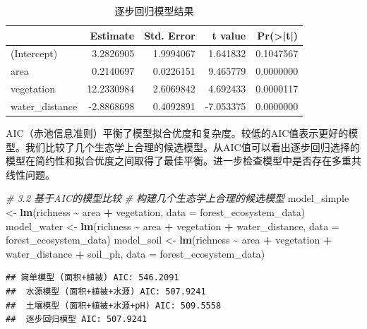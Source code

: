 \documentclass[
  twoside,12pt,fontset=none]{ctexbook}
\newenvironment{Shaded}{\begin{snugshade}}{\end{snugshade}}
\newcommand{\AttributeTok}[1]{\textcolor[rgb]{0.13,0.29,0.53}{#1}}
\newcommand{\CommentTok}[1]{\textcolor[rgb]{0.56,0.35,0.01}{\textit{#1}}}
\newcommand{\FunctionTok}[1]{\textcolor[rgb]{0.13,0.29,0.53}{\textbf{#1}}}
\newcommand{\NormalTok}[1]{#1}
\newcommand{\OtherTok}[1]{\textcolor[rgb]{0.56,0.35,0.01}{#1}}
\newcommand{\SpecialCharTok}[1]{\textcolor[rgb]{0.81,0.36,0.00}{\textbf{#1}}}
\begin{document}
\begin{table}[!h]
\centering
\caption{\label{tab:stepwise-model-results}逐步回归模型结果}
\centering
\begin{tabular}[t]{lrrrr}
\toprule
  & Estimate & Std. Error & t value & Pr(>|t|)\\
\midrule
(Intercept) & 3.2826905 & 1.9994067 & 1.641832 & 0.1047567\\
area & 0.2140697 & 0.0226151 & 9.465779 & 0.0000000\\
vegetation & 12.2330984 & 2.6069842 & 4.692433 & 0.0000117\\
water\_distance & -2.8868698 & 0.4092891 & -7.053375 & 0.0000000\\
\bottomrule
\end{tabular}
\end{table}

AIC（赤池信息准则）平衡了模型拟合优度和复杂度。较低的AIC值表示更好的模型。我们比较了几个生态学上合理的候选模型。从AIC值可以看出逐步回归选择的模型在简约性和拟合优度之间取得了最佳平衡。进一步检查模型中是否存在多重共线性问题。

\begin{Shaded}
\begin{Highlighting}[]
\CommentTok{\# 3.2 基于AIC的模型比较}
\CommentTok{\# 构建几个生态学上合理的候选模型}
\NormalTok{model\_simple }\OtherTok{\textless{}{-}} \FunctionTok{lm}\NormalTok{(richness }\SpecialCharTok{\textasciitilde{}}\NormalTok{ area }\SpecialCharTok{+}\NormalTok{ vegetation,}
                   \AttributeTok{data =}\NormalTok{ forest\_ecosystem\_data)}
\NormalTok{model\_water }\OtherTok{\textless{}{-}} \FunctionTok{lm}\NormalTok{(richness }\SpecialCharTok{\textasciitilde{}}\NormalTok{ area }\SpecialCharTok{+}\NormalTok{ vegetation }\SpecialCharTok{+}\NormalTok{ water\_distance,}
                  \AttributeTok{data =}\NormalTok{ forest\_ecosystem\_data)}
\NormalTok{model\_soil }\OtherTok{\textless{}{-}} \FunctionTok{lm}\NormalTok{(richness }\SpecialCharTok{\textasciitilde{}}\NormalTok{ area }\SpecialCharTok{+}\NormalTok{ vegetation }\SpecialCharTok{+}\NormalTok{ water\_distance }\SpecialCharTok{+}\NormalTok{ soil\_ph,}
                 \AttributeTok{data =}\NormalTok{ forest\_ecosystem\_data)}
\end{Highlighting}
\end{Shaded}

\begin{verbatim}
## 简单模型 (面积+植被) AIC: 546.2091 
##  水源模型 (面积+植被+水源) AIC: 507.9241 
##  土壤模型 (面积+植被+水源+pH) AIC: 509.5558 
##  逐步回归模型 AIC: 507.9241
\end{verbatim}
\end{document}
